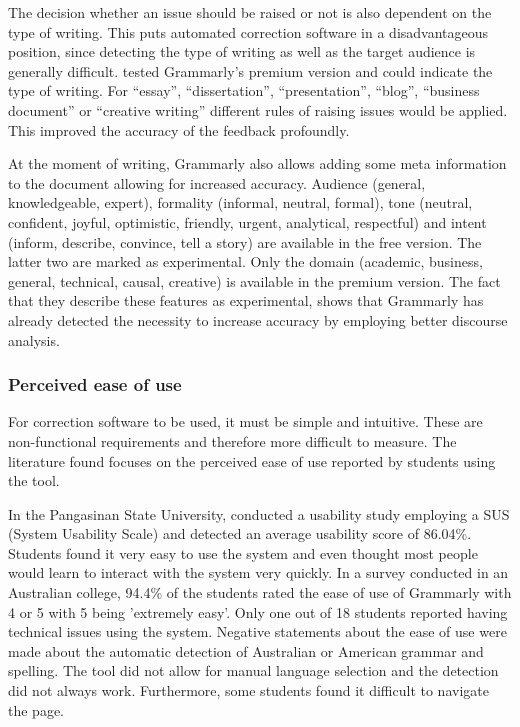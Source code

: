 \documentclass[runningheads]{llncs}
\let\OldTextregistered\textregistered
\renewcommand{\textregistered}{\OldTextregistered\xspace}
\begin{document}
The decision whether an issue should be raised or not is also dependent on the type of writing. This puts automated correction software in a disadvantageous position, since detecting the type of writing as well as the target audience is generally difficult. \textcite{cavaleri_you_2016} tested Grammarly\textregistered's premium version and could indicate the type of writing. For ``essay'', ``dissertation'', ``presentation'', ``blog'', ``business document'' or ``creative writing'' different rules of raising issues would be applied. This improved the accuracy of the feedback profoundly.

At the moment of writing, Grammarly\textregistered also allows adding some meta information to the document allowing for increased accuracy. Audience (general, knowledgeable, expert), formality (informal, neutral, formal), tone (neutral, confident, joyful, optimistic, friendly, urgent, analytical, respectful) and intent (inform, describe, convince, tell a story) are available in the free version. The latter two are marked as experimental. Only the domain (academic, business, general, technical, causal, creative) is available in the premium version. The fact that they describe these features as experimental, shows that Grammarly\textregistered has already detected the necessity to increase accuracy by employing better discourse analysis.

\subsubsection{Perceived ease of use}
For correction software to be used, it must be simple and intuitive. These are non-functional requirements and therefore more difficult to measure. The literature found focuses on the perceived ease of use reported by students using the tool.

In the Pangasinan State University, \textcite{ventayen_graduate_2018} conducted a usability study employing a SUS (System Usability Scale) and detected an average usability score of 86.04\%. Students found it very easy to use the system and even thought most people would learn to interact with the system very quickly. In a survey \citep{cavaleri_you_2016} conducted in an Australian college, 94.4\% of the students rated the ease of use of Grammarly\textregistered with 4 or 5 with 5 being 'extremely easy'. Only one out of 18 students reported having technical issues using the system. Negative statements about the ease of use were made about the automatic detection of Australian or American grammar and spelling. The tool did not allow for manual language selection and the detection did not always work. Furthermore, some students found it difficult to navigate the page.
\end{document}
